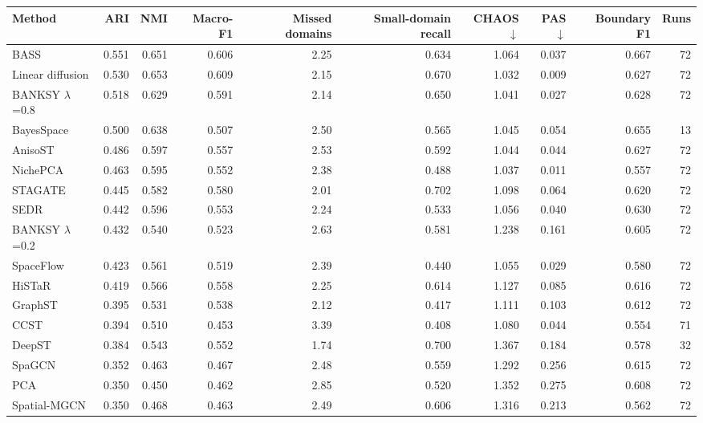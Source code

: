 \scriptsize
\begin{tabular}{lrrrrrrrrr}
\toprule
Method & ARI & NMI & Macro-F1 & Missed domains & Small-domain recall & CHAOS$\downarrow$ & PAS$\downarrow$ & Boundary F1 & Runs \\
\midrule
BASS & 0.551 & 0.651 & 0.606 & 2.25 & 0.634 & 1.064 & 0.037 & 0.667 & 72 \\
Linear diffusion & 0.530 & 0.653 & 0.609 & 2.15 & 0.670 & 1.032 & 0.009 & 0.627 & 72 \\
BANKSY $\lambda$=0.8 & 0.518 & 0.629 & 0.591 & 2.14 & 0.650 & 1.041 & 0.027 & 0.628 & 72 \\
BayesSpace & 0.500 & 0.638 & 0.507 & 2.50 & 0.565 & 1.045 & 0.054 & 0.655 & 13 \\
AnisoST & 0.486 & 0.597 & 0.557 & 2.53 & 0.592 & 1.044 & 0.044 & 0.627 & 72 \\
NichePCA & 0.463 & 0.595 & 0.552 & 2.38 & 0.488 & 1.037 & 0.011 & 0.557 & 72 \\
STAGATE & 0.445 & 0.582 & 0.580 & 2.01 & 0.702 & 1.098 & 0.064 & 0.620 & 72 \\
SEDR & 0.442 & 0.596 & 0.553 & 2.24 & 0.533 & 1.056 & 0.040 & 0.630 & 72 \\
BANKSY $\lambda$=0.2 & 0.432 & 0.540 & 0.523 & 2.63 & 0.581 & 1.238 & 0.161 & 0.605 & 72 \\
SpaceFlow & 0.423 & 0.561 & 0.519 & 2.39 & 0.440 & 1.055 & 0.029 & 0.580 & 72 \\
HiSTaR & 0.419 & 0.566 & 0.558 & 2.25 & 0.614 & 1.127 & 0.085 & 0.616 & 72 \\
GraphST & 0.395 & 0.531 & 0.538 & 2.12 & 0.417 & 1.111 & 0.103 & 0.612 & 72 \\
CCST & 0.394 & 0.510 & 0.453 & 3.39 & 0.408 & 1.080 & 0.044 & 0.554 & 71 \\
DeepST & 0.384 & 0.543 & 0.552 & 1.74 & 0.700 & 1.367 & 0.184 & 0.578 & 32 \\
SpaGCN & 0.352 & 0.463 & 0.467 & 2.48 & 0.559 & 1.292 & 0.256 & 0.615 & 72 \\
PCA & 0.350 & 0.450 & 0.462 & 2.85 & 0.520 & 1.352 & 0.275 & 0.608 & 72 \\
Spatial-MGCN & 0.350 & 0.468 & 0.463 & 2.49 & 0.606 & 1.316 & 0.213 & 0.562 & 72 \\
\bottomrule
\end{tabular}
